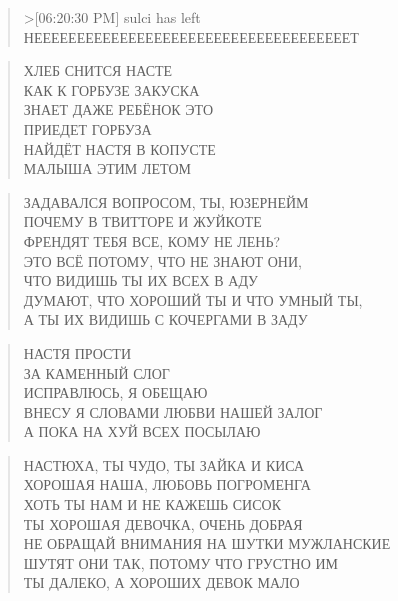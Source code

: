\poemtitle{***}
\begin{verse}
>[06:20:30 PM] sulci has left\\
НЕЕЕЕЕЕЕЕЕЕЕЕЕЕЕЕЕЕЕЕЕЕЕЕЕЕЕЕЕЕЕЕЕЕЕЕЕТ
\end{verse}

\poemtitle{***}
\begin{verse}
ХЛЕБ СНИТСЯ НАСТЕ \\
КАК К ГОРБУЗЕ ЗАКУСКА\\
ЗНАЕТ ДАЖЕ РЕБЁНОК ЭТО\\
ПРИЕДЕТ ГОРБУЗА\\
НАЙДЁТ НАСТЯ В КОПУСТЕ\\
МАЛЫША ЭТИМ ЛЕТОМ
\end{verse}

\poemtitle{***}
\begin{verse}
ЗАДАВАЛСЯ ВОПРОСОМ, ТЫ, ЮЗЕРНЕЙМ\\
ПОЧЕМУ В ТВИТТОРЕ И ЖУЙКОТЕ \\
ФРЕНДЯТ ТЕБЯ ВСЕ, КОМУ НЕ ЛЕНЬ?\\
ЭТО ВСЁ ПОТОМУ, ЧТО НЕ ЗНАЮТ ОНИ, \\
ЧТО ВИДИШЬ ТЫ ИХ ВСЕХ В АДУ\\
ДУМАЮТ, ЧТО ХОРОШИЙ ТЫ И ЧТО УМНЫЙ ТЫ,\\
А ТЫ ИХ ВИДИШЬ С КОЧЕРГАМИ В ЗАДУ
\end{verse}

\poemtitle{***}
\begin{verse}
НАСТЯ ПРОСТИ\\
ЗА КАМЕННЫЙ СЛОГ\\
ИСПРАВЛЮСЬ, Я ОБЕЩАЮ\\
ВНЕСУ Я СЛОВАМИ ЛЮБВИ НАШЕЙ ЗАЛОГ\\
А ПОКА НА ХУЙ ВСЕХ ПОСЫЛАЮ
\end{verse}

\poemtitle{***}
\begin{verse}
НАСТЮХА, ТЫ ЧУДО, ТЫ ЗАЙКА И КИСА\\
ХОРОШАЯ НАША, ЛЮБОВЬ ПОГРОМЕНГА\\
ХОТЬ ТЫ НАМ И НЕ КАЖЕШЬ СИСОК\\
ТЫ ХОРОШАЯ ДЕВОЧКА, ОЧЕНЬ ДОБРАЯ\\
НЕ ОБРАЩАЙ ВНИМАНИЯ  НА ШУТКИ МУЖЛАНСКИЕ\\
ШУТЯТ ОНИ ТАК, ПОТОМУ ЧТО ГРУСТНО ИМ\\
ТЫ ДАЛЕКО, А ХОРОШИХ ДЕВОК МАЛО
\end{verse}

